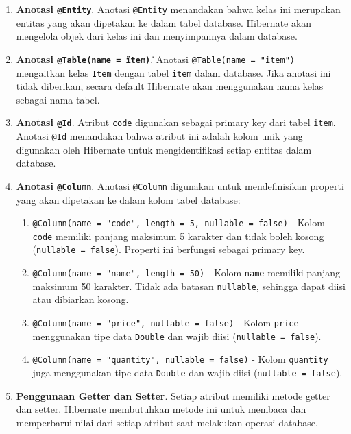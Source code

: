 \begin{enumerate}
	\item \textbf{Anotasi \texttt{@Entity}}. 
	Anotasi \texttt{@Entity} menandakan bahwa kelas ini merupakan entitas yang akan dipetakan ke dalam tabel database. Hibernate akan mengelola objek dari kelas ini dan menyimpannya dalam database.
	
	\item \textbf{Anotasi \texttt{@Table(name = \"item\")}}. 
	Anotasi \texttt{@Table(name = "item")} mengaitkan kelas \texttt{Item} dengan tabel \texttt{item} dalam database. Jika anotasi ini tidak diberikan, secara default Hibernate akan menggunakan nama kelas sebagai nama tabel.
	
	\item \textbf{Anotasi \texttt{@Id}}. 
	Atribut \texttt{code} digunakan sebagai primary key dari tabel \texttt{item}. Anotasi \texttt{@Id} menandakan bahwa atribut ini adalah kolom unik yang digunakan oleh Hibernate untuk mengidentifikasi setiap entitas dalam database.
	
	\item \textbf{Anotasi \texttt{@Column}}.
	Anotasi \texttt{@Column} digunakan untuk mendefinisikan properti yang akan dipetakan ke dalam kolom tabel database:
	\begin{enumerate}
		\item \texttt{@Column(name = "code", length = 5, nullable = false)} - Kolom \texttt{code} memiliki panjang maksimum 5 karakter dan tidak boleh kosong (\texttt{nullable = false}). Properti ini berfungsi sebagai primary key.
		\item \texttt{@Column(name = "name", length = 50)} - Kolom \texttt{name} memiliki panjang maksimum 50 karakter. Tidak ada batasan \texttt{nullable}, sehingga dapat diisi atau dibiarkan kosong.
		\item \texttt{@Column(name = "price", nullable = false)} - Kolom \texttt{price} menggunakan tipe data \texttt{Double} dan wajib diisi (\texttt{nullable = false}).
		\item \texttt{@Column(name = "quantity", nullable = false)} - Kolom \texttt{quantity} juga menggunakan tipe data \texttt{Double} dan wajib diisi (\texttt{nullable = false}).
	\end{enumerate}
	
	\item \textbf{Penggunaan Getter dan Setter}.
	Setiap atribut memiliki metode getter dan setter. Hibernate membutuhkan metode ini untuk membaca dan memperbarui nilai dari setiap atribut saat melakukan operasi database.

\end{enumerate}

